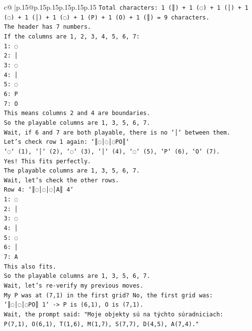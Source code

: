 \documentclass{article}
\begin{document}
{\begin{supertabular}{c@{$\;$}|p{.15\linewidth}@{}p{.15\linewidth}p{.15\linewidth}p{.15\linewidth}p{.15\linewidth}p{.15\linewidth}}
{{{\texttt{Total characters: 1 (║) + 1 (◌) + 1 (│) + 1 (◌) + 1 (│) + 1 (◌) + 1 (P) + 1 (O) + 1 (║) = 9 characters.} \\
\texttt{The header has 7 numbers.} \\
\texttt{If the columns are 1, 2, 3, 4, 5, 6, 7:} \\
\texttt{1: ◌} \\
\texttt{2: │} \\
\texttt{3: ◌} \\
\texttt{4: │} \\
\texttt{5: ◌} \\
\texttt{6: P} \\
\texttt{7: O} \\
\texttt{This means columns 2 and 4 are boundaries.} \\
\texttt{So the playable columns are 1, 3, 5, 6, 7.} \\
\texttt{Wait, if 6 and 7 are both playable, there is no `│` between them.} \\
\texttt{Let's check row 1 again: `║◌│◌│◌PO║`} \\
\texttt{`◌` (1), `│` (2), `◌` (3), `│` (4), `◌` (5), `P` (6), `O` (7).} \\
\texttt{Yes! This fits perfectly.} \\
\texttt{The playable columns are 1, 3, 5, 6, 7.} \\
\texttt{Wait, let's check the other rows.} \\
\texttt{Row 4: `║◌│◌│◌│A║ 4`} \\
\texttt{1: ◌} \\
\texttt{2: │} \\
\texttt{3: ◌} \\
\texttt{4: │} \\
\texttt{5: ◌} \\
\texttt{6: │} \\
\texttt{7: A} \\
\texttt{This also fits.} \\
\texttt{So the playable columns are 1, 3, 5, 6, 7.} \\
\texttt{Wait, let's re{-}verify my previous moves.} \\
\texttt{My P was at (7,1) in the first grid? No, the first grid was:} \\
\texttt{`║◌│◌│◌PO║ 1` {-}> P is (6,1), O is (7,1).} \\
\texttt{Wait, the prompt said: "Moje objekty sú na týchto súradniciach: P(7,1), O(6,1), T(1,6), M(1,7), S(7,7), D(4,5), A(7,4)."} \\
}}}
\end{supertabular}}
\end{document}
